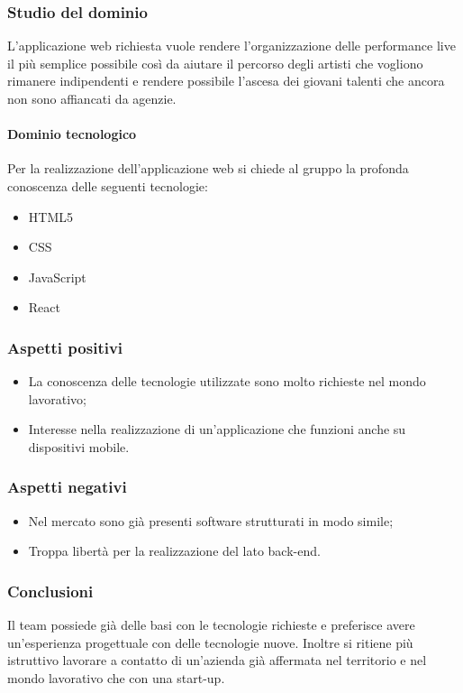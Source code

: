 		\subsubsection{Studio del dominio} \Spazio
			L'applicazione web richiesta vuole rendere l’organizzazione delle performance live il più semplice possibile così da aiutare il percorso degli artisti che vogliono rimanere indipendenti e rendere possibile l'ascesa dei giovani talenti che ancora non sono affiancati da agenzie.
			\paragraph{Dominio tecnologico} \Spazio
			Per la realizzazione dell'applicazione web si chiede al gruppo la profonda conoscenza delle seguenti tecnologie:
			\begin{itemize}
				\item HTML5
				\item CSS
				\item JavaScript
				\item React
			\end{itemize}
		\subsubsection{Aspetti positivi}
		\begin{itemize}
			\item La conoscenza delle tecnologie utilizzate sono molto richieste nel mondo lavorativo;
			\item Interesse nella realizzazione di un'applicazione che funzioni anche su dispositivi mobile.
		\end{itemize}
		\subsubsection{Aspetti negativi}
		\begin{itemize}
			\item Nel mercato sono già presenti software strutturati in modo simile;
			\item Troppa libertà per la realizzazione del lato back-end.
		\end{itemize}
		\subsubsection{Conclusioni}
		Il team possiede già delle basi con le tecnologie richieste e preferisce avere un'esperienza progettuale con delle tecnologie nuove. Inoltre si ritiene più istruttivo lavorare a contatto di un'azienda già affermata nel territorio e nel mondo lavorativo che con una start-up.
	
	